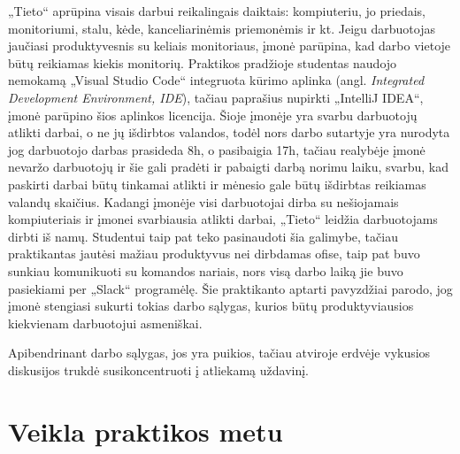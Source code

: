 \documentclass{VUMIFPSbakalaurinis}
\begin{document}
„Tieto“ aprūpina visais darbui reikalingais daiktais: kompiuteriu, jo priedais, monitoriumi, stalu, kėde, kanceliarinėmis priemonėmis ir kt. Jeigu darbuotojas jaučiasi produktyvesnis su keliais monitoriaus, įmonė parūpina, kad darbo vietoje būtų reikiamas kiekis monitorių. Praktikos pradžioje studentas naudojo nemokamą „Visual Studio Code“ integruota kūrimo aplinka (angl. \textit{Integrated Development Environment, IDE}), tačiau paprašius nupirkti „IntelliJ IDEA“, įmonė parūpino šios aplinkos licencija. Šioje įmonėje yra svarbu darbuotojų atlikti darbai, o ne jų išdirbtos valandos, todėl nors darbo sutartyje yra nurodyta jog darbuotojo darbas prasideda 8h, o pasibaigia 17h, tačiau realybėje įmonė nevaržo darbuotojų ir šie gali pradėti ir pabaigti darbą norimu laiku, svarbu, kad paskirti darbai būtų tinkamai atlikti ir mėnesio gale būtų išdirbtas reikiamas valandų skaičius. Kadangi įmonėje visi darbuotojai dirba su nešiojamais kompiuteriais ir įmonei svarbiausia atlikti darbai, „Tieto“ leidžia darbuotojams dirbti iš namų. Studentui taip pat teko pasinaudoti šia galimybe, tačiau praktikantas jautėsi mažiau produktyvus nei dirbdamas ofise, taip pat buvo sunkiau komunikuoti su komandos nariais, nors visą darbo laiką jie buvo pasiekiami per „Slack“ programėlę. Šie praktikanto aptarti pavyzdžiai parodo, jog įmonė stengiasi sukurti tokias darbo sąlygas, kurios būtų produktyviausios kiekvienam darbuotojui asmeniškai. 

Apibendrinant darbo sąlygas, jos yra puikios, tačiau atviroje erdvėje vykusios diskusijos trukdė susikoncentruoti į atliekamą uždavinį.
\section{Veikla praktikos metu}
\end{document}
